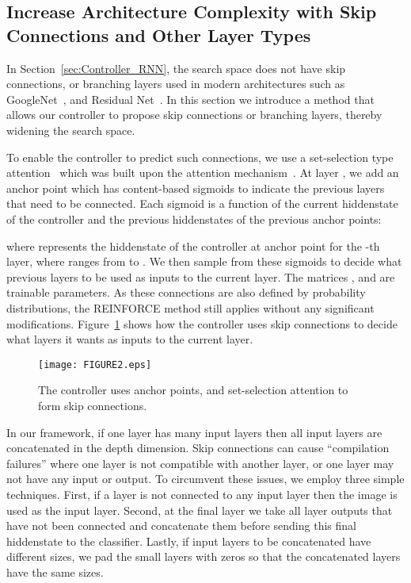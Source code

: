 \documentclass{article} \usepackage{iclr2017_conference,times}
\begin{document}
\subsection{Increase Architecture Complexity with Skip Connections and Other Layer Types}
\label{sec:skip_connection}



In Section~\ref{sec:Controller_RNN}, 
the search space does not have skip connections, or branching layers used in modern architectures such as GoogleNet~\citep{szegedy2015going}, and Residual Net~\citep{he2015deep}. In this section we introduce a method that allows our controller to propose skip connections or branching layers, thereby widening the search space. 

To enable the controller to predict such connections, we use a set-selection type attention~\citep{neelakantan2015neural} which was built upon the attention mechanism~\citep{bahdanau2014neural,vinyals2015pointer}. At layer , we add an anchor point which has  content-based sigmoids to indicate the previous layers that need to be connected. Each sigmoid is a function of the current hiddenstate of the controller and the previous hiddenstates of the previous  anchor points:


 where  represents the hiddenstate of the controller at anchor point for the -th layer, where  ranges from  to . We then sample from these sigmoids to decide what previous layers to be used as inputs to the current layer. The matrices ,   and  are trainable parameters. As these connections are also defined by probability distributions, the REINFORCE method still applies without any significant modifications. 
Figure~\ref{figure:Controller_RNN_PTR} shows how the controller uses skip connections to decide what layers it wants as inputs to the current layer.

\begin{figure}[h!]
\begin{center}
\centerline{\texttt{[image: FIGURE2.eps]}}
\caption{The controller uses anchor points, and set-selection attention to form skip connections.}
\label{figure:Controller_RNN_PTR}
\end{center}
\end{figure} 

In our framework, if one layer has many input layers then all input layers are concatenated in the depth dimension. Skip connections can cause ``compilation failures'' where one layer is not compatible with another layer, or one layer may not have any input or output. To circumvent these issues, we employ three simple techniques. First, if a layer is not connected to any input layer then the image is used as the input layer. Second, at the final layer we take all layer outputs that have not been connected and concatenate them before sending this final hiddenstate to the classifier. Lastly, if input layers to be concatenated have different sizes, we pad the small layers with zeros so that the concatenated layers have the same sizes. 
\end{document}
